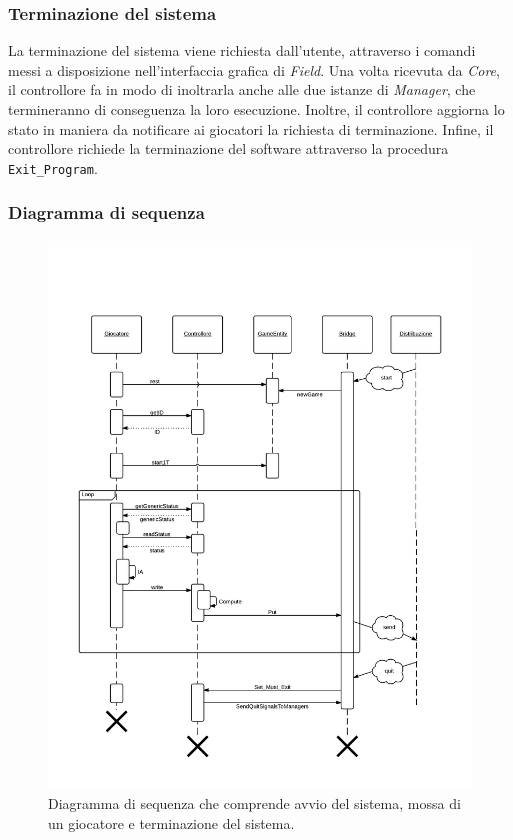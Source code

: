 \subsubsection{Terminazione del sistema}
\label{sec:implementazione_concorrenza_terminazione_sistema}

La terminazione del sistema viene richiesta dall'utente, attraverso i comandi messi a disposizione nell'interfaccia grafica di \emph{Field}. Una volta ricevuta da \emph{Core}, il controllore fa in modo di inoltrarla anche alle due istanze di \emph{Manager}, che termineranno di conseguenza la loro esecuzione. Inoltre, il controllore aggiorna lo stato in maniera da notificare ai giocatori la richiesta di terminazione. Infine, il controllore richiede la terminazione del software attraverso la procedura \verb+Exit_Program+.\\

\subsubsection{Diagramma di sequenza}
\label{sec:implementazione_concorrenza_diagramma_sequenza}

\begin{figure}[htp!]
	\centering
	\includegraphics[scale=.35]{images/system_sequence_diagram}
	\caption{Diagramma di sequenza che comprende avvio del sistema, mossa di un giocatore e terminazione del sistema.}
	\label{fig:sequence_diagram}
\end{figure}

